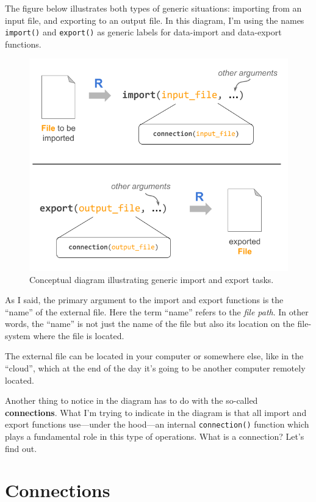 \documentclass[
]{book}
\begin{document}
The figure below illustrates both types of generic situations: importing
from an input file, and exporting to an output file. In this diagram, I'm using
the names \texttt{import()} and \texttt{export()} as generic labels for data-import and
data-export functions.

\begin{figure}

{\centering \includegraphics[width=0.7\linewidth]{images/inout/import-export-functions} 

}

\caption{Conceptual diagram illustrating generic import and export tasks.}\label{fig:unnamed-chunk-358}
\end{figure}

As I said, the primary argument to the import and export functions is the
``name'' of the external file. Here the term ``name'' refers to the \emph{file path}.
In other words, the ``name'' is not just the name of the file but also its
location on the file-system where the file is located.

The external file can be located in your computer or somewhere else, like
in the ``cloud'', which at the end of the day it's going to be another
computer remotely located.

Another thing to notice in the diagram has to do with the so-called
\textbf{connections}. What I'm trying to indicate in the diagram is that all import
and export functions use---under the hood---an internal \texttt{connection()} function
which plays a fundamental role in this type of operations. What is a connection?
Let's find out.

\hypertarget{connections}{%
\section{Connections}\label{connections}}
\end{document}
